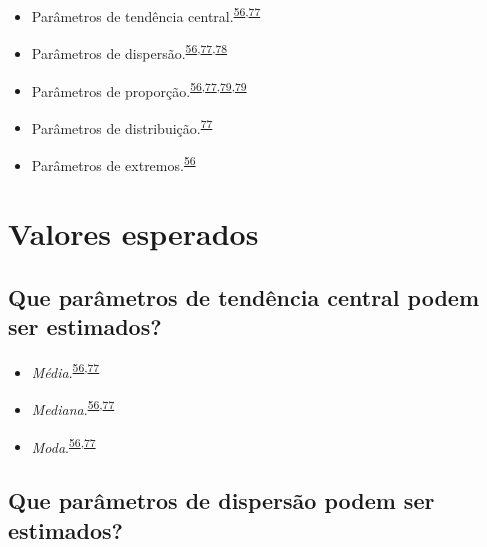 \documentclass[
  a4paper,
]{book}
\begin{document}
\begin{itemize}
\item
  Parâmetros de tendência central.\textsuperscript{\protect\hyperlink{ref-Ali2016}{56},\protect\hyperlink{ref-kanji2006}{77}}
\item
  Parâmetros de dispersão.\textsuperscript{\protect\hyperlink{ref-Ali2016}{56},\protect\hyperlink{ref-kanji2006}{77},\protect\hyperlink{ref-Curran-Everett2008}{78}}
\item
  Parâmetros de proporção.\textsuperscript{\protect\hyperlink{ref-Ali2016}{56},\protect\hyperlink{ref-kanji2006}{77},\protect\hyperlink{ref-Altman1994}{79},\protect\hyperlink{ref-Altman1994}{79}}
\item
  Parâmetros de distribuição.\textsuperscript{\protect\hyperlink{ref-kanji2006}{77}}
\item
  Parâmetros de extremos.\textsuperscript{\protect\hyperlink{ref-Ali2016}{56}}
\end{itemize}

\hypertarget{valores-esperados}{%
\section{Valores esperados}\label{valores-esperados}}

\hypertarget{que-paruxe2metros-de-tenduxeancia-central-podem-ser-estimados}{%
\subsection{Que parâmetros de tendência central podem ser estimados?}\label{que-paruxe2metros-de-tenduxeancia-central-podem-ser-estimados}}

\begin{itemize}
\item
  \emph{Média}.\textsuperscript{\protect\hyperlink{ref-Ali2016}{56},\protect\hyperlink{ref-kanji2006}{77}}
\item
  \emph{Mediana}.\textsuperscript{\protect\hyperlink{ref-Ali2016}{56},\protect\hyperlink{ref-kanji2006}{77}}
\item
  \emph{Moda}.\textsuperscript{\protect\hyperlink{ref-Ali2016}{56},\protect\hyperlink{ref-kanji2006}{77}}
\end{itemize}

\hypertarget{que-paruxe2metros-de-dispersuxe3o-podem-ser-estimados}{%
\subsection{Que parâmetros de dispersão podem ser estimados?}\label{que-paruxe2metros-de-dispersuxe3o-podem-ser-estimados}}
\end{document}
